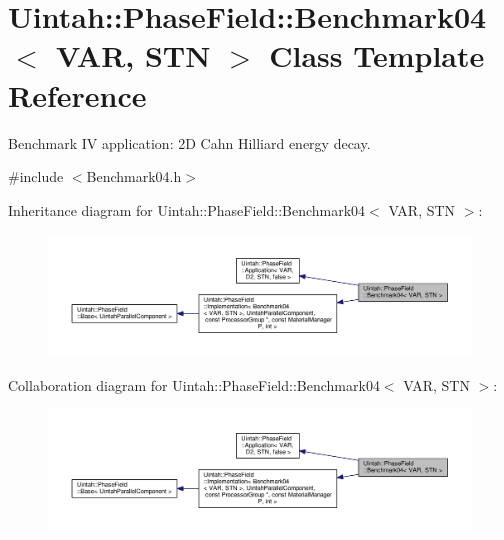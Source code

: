 \hypertarget{classUintah_1_1PhaseField_1_1Benchmark04}{}\section{Uintah\+:\+:Phase\+Field\+:\+:Benchmark04$<$ V\+AR, S\+TN $>$ Class Template Reference}
\label{classUintah_1_1PhaseField_1_1Benchmark04}


Benchmark IV application\+: 2D Cahn Hilliard energy decay.  




{\ttfamily \#include $<$Benchmark04.\+h$>$}



Inheritance diagram for Uintah\+:\+:Phase\+Field\+:\+:Benchmark04$<$ V\+AR, S\+TN $>$\+:\nopagebreak
\begin{figure}[H]
\begin{center}
\leavevmode
\includegraphics[width=350pt]{classUintah_1_1PhaseField_1_1Benchmark04__inherit__graph}
\end{center}
\end{figure}


Collaboration diagram for Uintah\+:\+:Phase\+Field\+:\+:Benchmark04$<$ V\+AR, S\+TN $>$\+:\nopagebreak
\begin{figure}[H]
\begin{center}
\leavevmode
\includegraphics[width=350pt]{classUintah_1_1PhaseField_1_1Benchmark04__coll__graph}
\end{center}
\end{figure}
